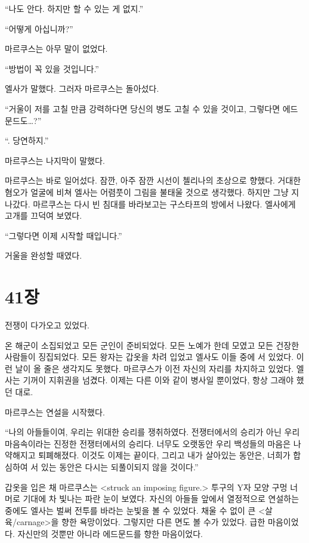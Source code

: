 ``나도 안다. 하지만 할 수 있는 게 없지.''

``어떻게 아십니까?''

마르쿠스는 아무 말이 없었다.

``방법이 꼭 있을 것입니다.''

엘사가 말했다. 그러자 마르쿠스는 돌아섰다.

``거울이 저를 고칠 만큼 강력하다면 당신의 병도 고칠 수 있을 것이고, 그렇다면 에드문드도\ldots?''

``. 당연하지.''

마르쿠스는 나지막이 말했다.

마르쿠스는 바로 일어섰다. 잠깐, 아주 잠깐 시선이 첼리나의 초상으로 향했다. 거대한 혐오가 얼굴에 비쳐 엘사는 어렴풋이 그림을 불태울 것으로 생각했다. 하지만 그냥 지나갔다. 마르쿠스는 다시 빈 침대를 바라보고는 구스타프의 방에서 나왔다. 엘사에게 고개를 끄덕여 보였다.

``그렇다면 이제 시작할 때입니다.''

거울을 완성할 때였다.



\chapter[41장  ~~][41장\hspace*{.5em}~~]{41장 \ ~~}



전쟁이 다가오고 있었다.

온 해군이 소집되었고 모든 군인이 준비되었다. 모든 노예가 한데 모였고 모든 건장한 사람들이 징집되었다. 모든 왕자는 갑옷을 차려 입었고 엘사도 이들 중에 서 있었다. 이런 날이 올 줄은 생각지도 못했다. 마르쿠스가 이전 자신의 자리를 차지하고 있었다. 엘사는 기꺼이 지휘권을 넘겼다. 이제는 다른 이와 같이 병사일 뿐이었다, 항상 그래야 했던 대로.

마르쿠스는 연설을 시작했다.

``나의 아들들이여, 우리는 위대한 승리를 쟁취하였다. 전쟁터에서의 승리가 아닌 우리 마음속이라는 진정한 전쟁터에서의 승리다. 너무도 오랫동안 우리 백성들의 마음은 나약해지고 퇴폐해졌다. 이것도 이제는 끝이다, 그리고 내가 살아있는 동안은, 너희가 합심하여 서 있는 동안은 다시는 되풀이되지 않을 것이다.''

갑옷을 입은 채 마르쿠스는 <struck an imposing figure.> 투구의 Y자 모양 구멍 너머로 기대에 차 빛나는 파란 눈이 보였다. 자신의 아들들 앞에서 열정적으로 연설하는 중에도 엘사는 벌써 전투를 바라는 눈빛을 볼 수 있었다. 채울 수 없이 큰 <살육/carnage>을 향한 욕망이었다. 그렇지만 다른 면도 볼 수가 있었다. 급한 마음이었다. 자신만의 것뿐만 아니라 에드문드를 향한 마음이었다.

